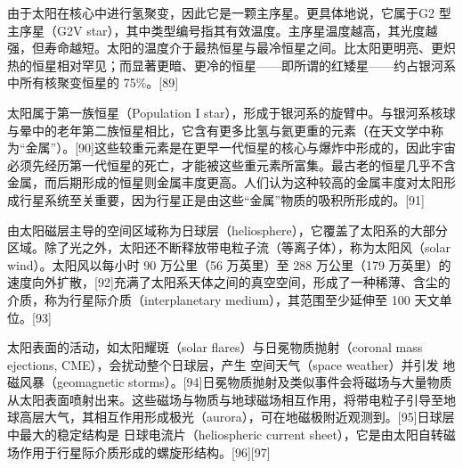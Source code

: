由于太阳在核心中进行氢聚变，因此它是一颗主序星。更具体地说，它属于G2 型主序星（G2V star），其中类型编号指其有效温度。主序星温度越高，其光度越强，但寿命越短。太阳的温度介于最热恒星与最冷恒星之间。比太阳更明亮、更炽热的恒星相对罕见；而显著更暗、更冷的恒星——即所谓的红矮星——约占银河系中所有核聚变恒星的 75\%。[89]

太阳属于第一族恒星（Population I star），形成于银河系的旋臂中。与银河系核球与晕中的老年第二族恒星相比，它含有更多比氢与氦更重的元素（在天文学中称为“金属”）。[90]这些较重元素是在更早一代恒星的核心与爆炸中形成的，因此宇宙必须先经历第一代恒星的死亡，才能被这些重元素所富集。最古老的恒星几乎不含金属，而后期形成的恒星则金属丰度更高。人们认为这种较高的金属丰度对太阳形成行星系统至关重要，因为行星正是由这些“金属”物质的吸积所形成的。[91]

由太阳磁层主导的空间区域称为日球层（heliosphere），它覆盖了太阳系的大部分区域。除了光之外，太阳还不断释放带电粒子流（等离子体），称为太阳风（solar wind）。太阳风以每小时 90 万公里（56 万英里）至 288 万公里（179 万英里）的速度向外扩散，[92]充满了太阳系天体之间的真空空间，形成了一种稀薄、含尘的介质，称为行星际介质（interplanetary medium），其范围至少延伸至 100 天文单位。[93]

太阳表面的活动，如太阳耀斑（solar flares）与日冕物质抛射（coronal mass ejections, CME），会扰动整个日球层，产生 空间天气（space weather）并引发 地磁风暴（geomagnetic storms）。[94]日冕物质抛射及类似事件会将磁场与大量物质从太阳表面喷射出来。这些磁场与物质与地球磁场相互作用，将带电粒子引导至地球高层大气，其相互作用形成极光（aurora），可在地磁极附近观测到。[95]日球层中最大的稳定结构是 日球电流片（heliospheric current sheet），它是由太阳自转磁场作用于行星际介质形成的螺旋形结构。[96][97]



